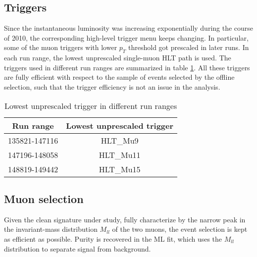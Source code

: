 \documentclass{cmspaper}
\begin{document}

\subsection{Triggers}

Since the instantaneous luminosity was increasing exponentially during
the course of 2010, the corresponding high-level trigger menu keeps
changing.  In particular, some of the muon triggers with lower $p_T$
threshold got prescaled in later runs.  In each run range, the lowest
unprescaled single-muon HLT path is used.  The triggers used in
different run ranges are summarized in table \ref{Table_TriggerUsed}.
All these triggers are fully efficient with respect to the sample of
events selected by the offline selection, such that the trigger
efficiency is not an issue in the analysis.

\begin{table}[htbp]
   \caption{Lowest unprescaled trigger in different run ranges}
   \centering
   \begin{tabular}{|c|c|}
   \hline
   Run range & Lowest unprescaled trigger \\\hline
   135821-147116 & HLT\_Mu9 \\\hline
   147196-148058 & HLT\_Mu11 \\\hline
   148819-149442 & HLT\_Mu15 \\\hline
   \end{tabular}
   \label{Table_TriggerUsed}
\end{table}

\subsection{Muon selection}

Given the clean signature under study, fully characterize by the
narrow peak in the invariant-mass distribution $M_{ll}$ of the two
muons, the event selection is kept as efficient as possible.  Purity
is recovered in the ML fit, which uses the $M_{ll}$ distribution to
separate signal from background.
\end{document}
